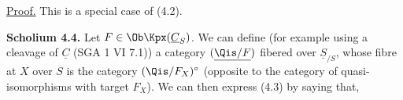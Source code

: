 \uline{Proof.} This is a special case of (4.2).

\textbf{Scholium 4.4.} Let \(F\in\Ob\Kpx(\underline{C}_S)\). We can define (for example using a cleavage of \(\underline{C}\) (SGA 1 VI 7.1)) a category \((\underline{\Qis/F})\) fibered over \(\underline{S}_{/S}\), whose fibre at \(X\) over \(S\) is the category \((\Qis/F_X)^\circ\) (opposite to the category of quasi-isomorphisms with target \(F_X\)). We can then express (4.3) by saying that,
